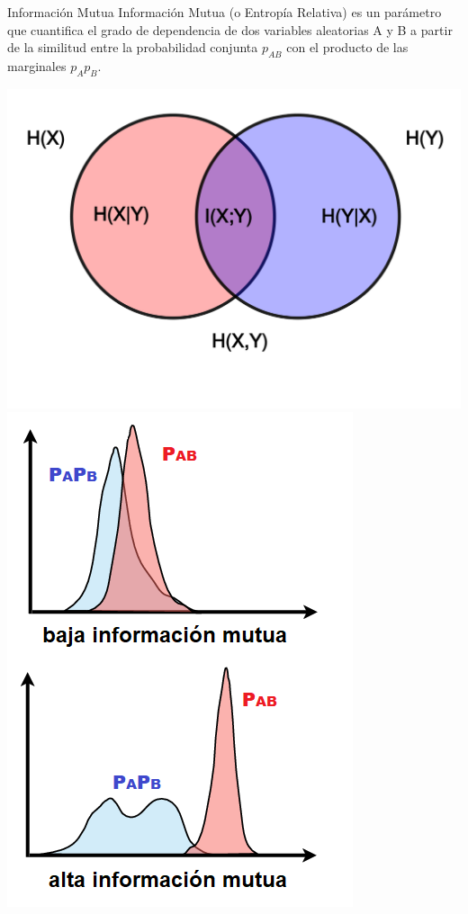 \documentclass[14pt,xcolor={rgb}]{beamer}
\begin{document}
\begin{frame}{Informaci\'on Mutua}
\footnotesize Informaci\'on Mutua (o Entrop\'ia Relativa) es un par\'ametro que cuantifica el grado de dependencia de dos variables aleatorias A y B a partir de la similitud entre la probabilidad conjunta $p_{AB}$ con el producto de las marginales $p_Ap_B$.

\includegraphics[scale=0.15]{Images/mutual-information-diagram.png}
\includegraphics[scale=0.35]{Images/pdf_distance.png}
\end{frame}
\end{document}
